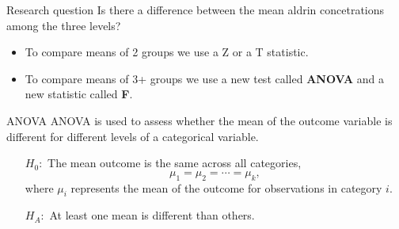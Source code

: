 \documentclass[
  ignorenonframetext,
]{beamer}
\providecommand{\tightlist}{%
  \setlength{\itemsep}{0pt}\setlength{\parskip}{0pt}}
\begin{document}
\begin{frame}{Research question}
\protect\hypertarget{research-question}{}
\alert{Is there a difference between the mean aldrin concetrations among the three levels?}

\pause

\begin{itemize}
\tightlist
\item
  To compare means of 2 groups we use a Z or a T statistic.
\end{itemize}

\pause

\begin{itemize}
\tightlist
\item
  To compare means of 3+ groups we use a new test called \textbf{ANOVA}
  and a new statistic called \textbf{F}.
\end{itemize}
\end{frame}

\begin{frame}{ANOVA}
\protect\hypertarget{anova}{}
ANOVA is used to assess whether the mean of the outcome variable is
different for different levels of a categorical variable.

\begin{itemize}
\item[$H_0:$] The mean outcome is the same across all categories, 
\[\mu_1 = \mu_2 = \cdots = \mu_k, \]
where $\mu_i$ represents the mean of the outcome for observations in category $i$.
\item[]
\item[$H_A:$] At least one mean is different than others.
\end{itemize}
\end{frame}
\end{document}

